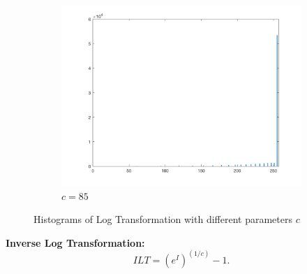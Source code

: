 \documentclass{article}
\newcommand{\tb}{\textbf}
\begin{document}
\begin{enumerate}[label=(\alph*)]
\begin{figure}[!htb]
\begin{subfigure}[b]{0.3\textwidth}
            \includegraphics[width=\textwidth]{img/hist_LT85.png}
            \caption{$c = 85$}
        \end{subfigure}
        \caption{Histograms of Log Transformation with different parameters $c$}
        \label{Histograms of Log Transformation with different parameters $c$}        
    \end{figure}
    
    \newpage
    \tb{Inverse Log Transformation:} $$ILT = {(e^I)}^{(1 / c)} - 1.$$ 


\end{enumerate}
\end{document}
